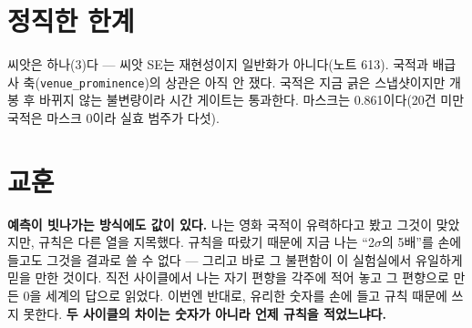 \documentclass[10pt]{article}
\begin{document}
\section{정직한 한계}

씨앗은 하나(3)다 --- 씨앗 SE는 재현성이지 일반화가 아니다(노트 613).
국적과 배급사 축(\texttt{venue\_prominence})의 상관은 아직 안 쟀다.
국적은 지금 긁은 스냅샷이지만 개봉 후 바뀌지 않는 불변량이라 시간
게이트는 통과한다. 마스크는 0.861이다(20건 미만 국적은 마스크 0이라
실효 범주가 다섯).

\section{교훈}

\textbf{예측이 빗나가는 방식에도 값이 있다.} 나는 영화 국적이
유력하다고 봤고 그것이 맞았지만, 규칙은 다른 열을 지목했다. 규칙을
따랐기 때문에 지금 나는 ``2$\sigma$의 5배''를 손에 들고도 그것을
결과로 쓸 수 없다 --- 그리고 바로 그 불편함이 이 실험실에서 유일하게
믿을 만한 것이다. 직전 사이클에서 나는 자기 편향을 각주에 적어 놓고
그 편향으로 만든 0을 세계의 답으로 읽었다. 이번엔 반대로, 유리한
숫자를 손에 들고 규칙 때문에 쓰지 못한다. \textbf{두 사이클의 차이는
숫자가 아니라 언제 규칙을 적었느냐다.}
\end{document}
